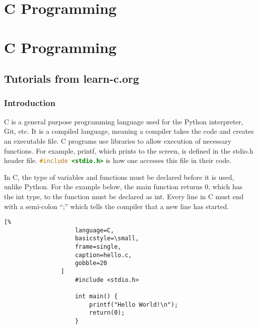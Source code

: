 \documentclass[crop=false,class=article,oneside]{standalone}
\begin{document}
    \ifx\ifcoursesprogrammingtutorials\undefined
        \section*{C Programming}
        \setcounter{section}{2}
    \else
        \section{C Programming}
    \fi
    \subsection{Tutorials from learn-c.org}
        \subsubsection{Introduction}
            C is a general purpose programming language used for the
            Python interpreter, Git, etc. It is a compiled language,
            meaning a compiler takes the code and creates an
            executable file. C programs use libraries to allow
            execution of necessary functions. For example, printf,
            which prints to the screen, is defined in the stdio.h
            header file.
            \lstinline[language=C]{#include <stdio.h>}
            is how one accesses this
            file in their code.
            \par\hfill\par
            In C, the type of variables and functions must be
            declared before it is used, unlike Python. For the
            example below, the main function returns 0, which has
            the int type, to the function must be declared as int.
            Every line in C must end with a semi-colon ``;''
            which tells the compiler that a new line has started.
            \newline
            \begin{minipage}[t]{.48\textwidth}
                \centering
                \begin{lstlisting}[%
                    language=C,
                    basicstyle=\small,
                    frame=single,
                    caption=hello.c,
                    gobble=20
                ]
                    #include <stdio.h>
                    
                    int main() {
                        printf("Hello World!\n");
                        return(0);
                    }
                \end{lstlisting}
            \end{minipage}\hfill
\end{document}
